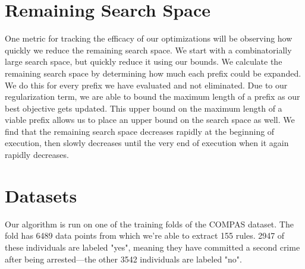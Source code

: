 \section{Remaining Search Space}
One metric for tracking the efficacy of our optimizations will be observing how quickly we reduce the remaining search space.
We start with a combinatorially large search space, but quickly reduce it using our bounds.
We calculate the remaining search space by determining how much each prefix could be expanded.
We do this for every prefix we have evaluated and not eliminated.
Due to our regularization term, we are able to bound the maximum length of a prefix as our best objective gets updated.
This upper bound on the maximum length of a viable prefix allows us to place an upper bound on the search space as well.
We find that the remaining search space decreases rapidly at the beginning of execution, then slowly decreases until the very end of execution when it again rapidly decreases.

\section{Datasets}
\label{def:datasets}
Our algorithm is run on one of the training folds of the COMPAS dataset.
The fold has 6489 data points from which we're able to extract 155 rules.
2947 of these individuals are labeled "yes", meaning they have committed a second crime after being arrested---the other 3542 individuals are labeled "no".